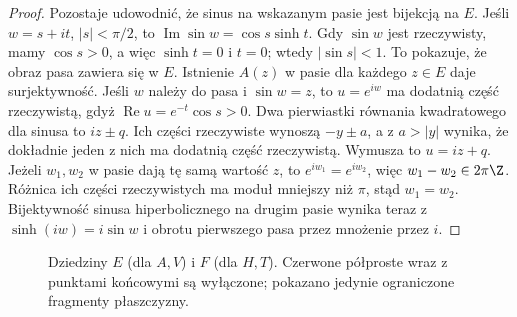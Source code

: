 \begin{proof}
Pozostaje udowodnić, że sinus na wskazanym pasie jest
bijekcją na $E$. Jeśli $w=s+it$, $|s|<\pi/2$,
to $\operatorname{Im}\sin w=\cos s\sinh t$.
Gdy $\sin w$ jest rzeczywisty, mamy $\cos s>0$,
a więc $\sinh t=0$ i $t=0$; wtedy $|\sin s|<1$.
To pokazuje, że obraz pasa zawiera się w $E$.
Istnienie $A(z)$ w pasie dla każdego $z\in E$ daje
surjektywność. Jeśli $w$ należy do pasa i $\sin w=z$,
to $u=e^{iw}$ ma dodatnią część rzeczywistą,
gdyż $\operatorname{Re}u=e^{-t}\cos s>0$.
Dwa pierwiastki równania kwadratowego dla sinusa
to $iz\pm q$. Ich części rzeczywiste wynoszą
$-y\pm a$, a z $a>|y|$ wynika, że dokładnie
jeden z nich ma dodatnią część rzeczywistą.
Wymusza to $u=iz+q$. Jeżeli $w_1,w_2$ w pasie
dają tę samą wartość $z$, to $e^{iw_1}=e^{iw_2}$,
więc $w_1-w_2\in2\pi\Z$. Różnica ich części
rzeczywistych ma moduł mniejszy niż $\pi$, stąd $w_1=w_2$.
Bijektywność sinusa hiperbolicznego na drugim pasie
wynika teraz z $\sinh(iw)=i\sin w$ i obrotu pierwszego
pasa przez mnożenie przez $i$.
\end{proof}

\begin{figure}[htbp]
\centering
{}
\caption{Dziedziny $E$ (dla $A,V$) i $F$ (dla $H,T$).
Czerwone półproste wraz z punktami końcowymi są wyłączone;
pokazano jedynie ograniczone fragmenty płaszczyzny.}
\label{ma2:fig:inverse-cuts}
\end{figure}

